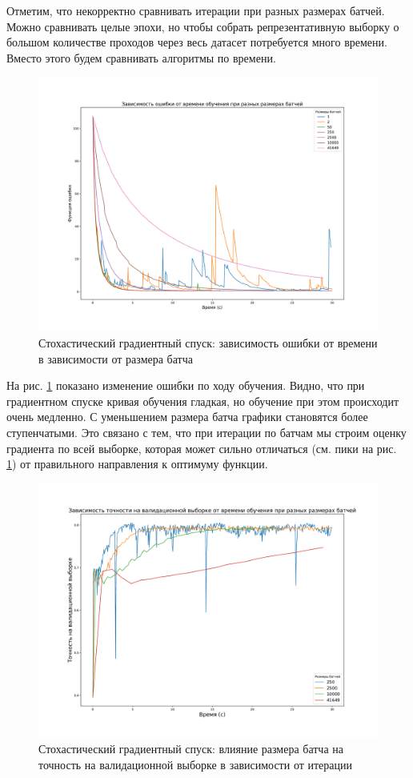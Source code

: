 \documentclass{article}
\begin{document}
                Отметим, что некорректно сравнивать итерации при разных размерах батчей. Можно сравнивать целые эпохи, но чтобы собрать репрезентативную выборку о большом количестве проходов через весь датасет потребуется много времени. Вместо этого будем сравнивать алгоритмы по времени.

                \begin{figure}[H]
                    \centering
                    \includegraphics[width=0.8\linewidth]{./pictures/GDbatch_func.pdf}
                    \caption{Стохастический градиентный спуск: зависимость ошибки от времени в зависимости от размера батча}
                    \label{fig:8}
                \end{figure}
                На рис. \ref{fig:8} показано изменение ошибки по ходу обучения. Видно, что при градиентном спуске кривая обучения гладкая, но обучение при этом происходит очень медленно. С уменьшением размера батча графики становятся более ступенчатыми. Это связано с тем, что при итерации по батчам мы строим оценку градиента по всей выборке, которая может сильно отличаться (см. пики на рис. \ref{fig:8}) от правильного направления к оптимуму функции.
                \begin{figure}[t]
                    \centering
                    \includegraphics[width=0.8\linewidth]{./pictures/GDbatch_val_accuracy.pdf}
                    \caption{Стохастический градиентный спуск: влияние размера батча на точность на валидационной выборке в зависимости от итерации}
                    \label{fig:9}
                \end{figure}
                
\end{document}
